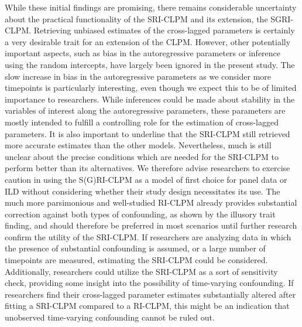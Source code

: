 \documentclass[
  man,
  floatsintext,
  longtable,
  nolmodern,
  notxfonts,
  notimes,
  colorlinks=true,linkcolor=blue,citecolor=blue,urlcolor=blue]{apa7}
\begin{document}
While these initial findings are promising, there remains considerable
uncertainty about the practical functionality of the SRI-CLPM and its
extension, the SGRI-CLPM. Retrieving unbiased estimates of the
cross-lagged parameters is certainly a very desirable trait for an
extension of the CLPM. However, other potentially important aspects,
such as bias in the autoregressive parameters or inference using the
random intercepts, have largely been ignored in the present study. The
slow increase in bias in the autoregressive parameters as we consider
more timepoints is particularly interesting, even though we expect this
to be of limited importance to researchers. While inferences could be
made about stability in the variables of interest along the
autoregressive parameters, these parameters are mostly intended to
fulfill a controlling role for the estimation of cross-lagged
parameters. It is also important to underline that the SRI-CLPM still
retrieved more accurate estimates than the other models. Nevertheless,
much is still unclear about the precise conditions which are needed for
the SRI-CLPM to perform better than its alternatives. We therefore
advise researchers to exercise caution in using the S(G)RI-CLPM as a
model of first choice for panel data or ILD without considering whether
their study design necessitates its use. The much more parsimonious and
well-studied RI-CLPM already provides substantial correction against
both types of confounding, as shown by the illusory trait finding, and
should therefore be preferred in most scenarios until further research
confirm the utility of the SRI-CLPM. If researchers are analyzing data
in which the presence of substantial confounding is assumed, or a large
number of timepoints are measured, estimating the SRI-CLPM could be
considered. Additionally, researchers could utilize the SRI-CLPM as a
sort of sensitivity check, providing some insight into the possibility
of time-varying confounding. If researchers find their cross-lagged
parameter estimates substantially altered after fitting a SRI-CLPM
compared to a RI-CLPM, this might be an indication that unobserved
time-varying confounding cannot be ruled out.
\end{document}
